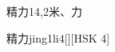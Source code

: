 \begin{entry}{精力}{14,2}{⽶、⼒}
  \begin{phonetics}{精力}{jing1li4}[][HSK 4]
  \end{phonetics}
\end{entry}
